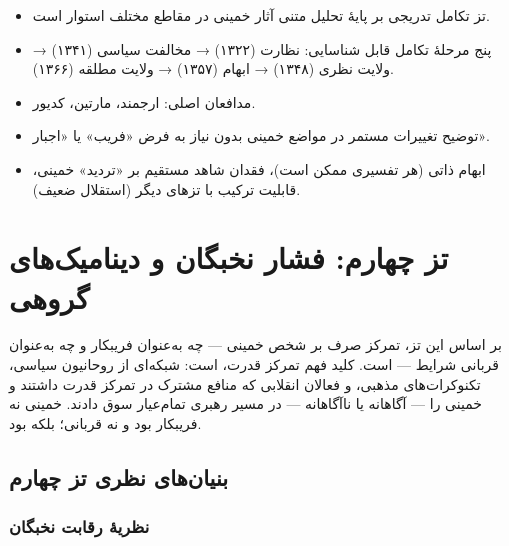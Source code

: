 \begin{principleBox}
\begin{itemize}[label=\textcolor{cPrimary}{$\blacksquare$}, rightmargin=2em]
    \item تز تکامل تدریجی بر پایهٔ تحلیل متنی آثار خمینی در مقاطع مختلف استوار است.
    \item پنج مرحلهٔ تکامل قابل شناسایی: نظارت (۱۳۲۲) → مخالفت سیاسی (۱۳۴۱) → ولایت نظری (۱۳۴۸) → ابهام (۱۳۵۷) → ولایت مطلقه (۱۳۶۶).
    \item مدافعان اصلی: ارجمند، مارتین، کدیور.
    \item {} توضیح تغییرات مستمر در مواضع خمینی بدون نیاز به فرض «فریب» یا «اجبار».
    \item {} ابهام ذاتی (هر تفسیری ممکن است)، فقدان شاهد مستقیم بر «تردید» خمینی، قابلیت ترکیب با تزهای دیگر (استقلال ضعیف).
\end{itemize}
\end{principleBox}


\chapter{تز چهارم: فشار نخبگان و دینامیک‌های گروهی}

\begin{infoBox}
بر اساس این تز، تمرکز صرف بر شخص خمینی — چه به‌عنوان فریبکار و چه به‌عنوان قربانی شرایط —  است. کلید فهم تمرکز قدرت،  است: شبکه‌ای از روحانیون سیاسی، تکنوکرات‌های مذهبی، و فعالان انقلابی که منافع مشترک در تمرکز قدرت داشتند و خمینی را — آگاهانه یا ناآگاهانه — در مسیر رهبری تمام‌عیار سوق دادند. خمینی نه فریبکار بود و نه قربانی؛ بلکه  بود.
\end{infoBox}

\section{بنیان‌های نظری تز چهارم}

\subsection{نظریهٔ رقابت نخبگان}


